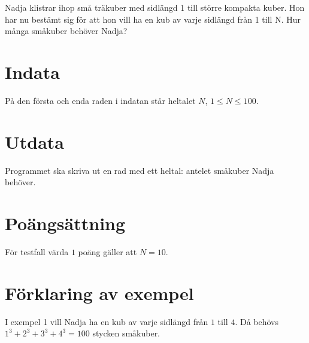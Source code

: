 %
Nadja klistrar ihop små träkuber med sidlängd 1 till större kompakta kuber. Hon har nu bestämt sig för att hon vill ha en kub av varje sidlängd från 1 till N. Hur många småkuber behöver Nadja?

\section*{Indata}
På den första och enda raden i indatan står heltalet $N$, $1 \leq N \leq 100$.

\section*{Utdata}
Programmet ska skriva ut en rad med ett heltal: antelet småkuber Nadja behöver.

\section*{Poängsättning}
För testfall värda $1$ poäng gäller att $N=10$.

\section*{Förklaring av exempel}
I exempel 1 vill Nadja ha en kub av varje sidlängd från $1$ till $4$.
Då behövs $1^3 + 2^3 + 3^3 + 4^3 = 100$ stycken småkuber.
